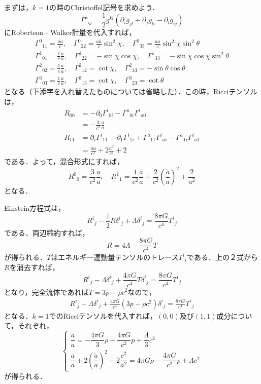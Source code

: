 \documentclass[a4paper]{ltjsreport}
\begin{document}
まずは，$k=1$の時のChristoffel記号を求めよう．
\[{\Gamma^k}_{ij}=\frac{1}{2}g^{kl}\left(\partial_ig_{jl} + \partial_jg_{li} - \partial_lg_{ij}\right)\]
にRobertson - Walker計量を代入すれば，
\begin{align*}
  {\Gamma^0}_{11}=\frac{a\dot{a}}{c}, \quad{\Gamma^0}_{22}=\frac{a\dot{a}}{c}\sin^2\chi, \quad{\Gamma^0}_{33}=\frac{a\dot{a}}{c}\sin^2\chi\sin^2\theta\\
  {\Gamma^1}_{01}=\frac{1}{c}\frac{\dot{a}}{a}, \quad{\Gamma^1}_{22}= - \sin\chi\cos\chi, \quad{\Gamma^1}_{33}= - \sin\chi\cos\chi\sin^2\theta\\
  {\Gamma^2}_{02}=\frac{1}{c}\frac{\dot{a}}{a}, \quad{\Gamma^2}_{12}=\cot\chi, \quad{\Gamma^2}_{33}= - \sin\theta\cos\theta\\
  {\Gamma^3}_{03}=\frac{1}{c}\frac{\dot{a}}{a}, \quad{\Gamma^3}_{13}=\cot\chi, \quad{\Gamma^3}_{23}=\cot\theta
\end{align*}
となる（下添字を入れ替えたものについては省略した）．この時，Ricciテンソルは，
\begin{align*}
  R_{00} &= -  \partial_0{\Gamma^i}_{0i} - {\Gamma^a}_{0i}{\Gamma^i}_{a0}\\
  &= -  \frac{3}{c^2}\frac{\ddot{a}}{a}\\
  R_{11} &= \partial_i{\Gamma^i}_{11} - \partial_1{\Gamma^i}_{1i} + {\Gamma^a}_{11}{\Gamma^i}_{ai} - {\Gamma^a}_{1i}{\Gamma^i}_{a1}\\
  &= \frac{a\ddot{a}}{c^2} + 2\frac{\dot{a}^2}{c^2} + 2
\end{align*}
である．よって，混合形式にすれば，
\[{R^0}_0=\frac{3}{c^2}\frac{\ddot{a}}{a}, \quad{R^1}_1=\frac{1}{c^2}\frac{\ddot{a}}{a} + \frac{2}{c^2}\left(\frac{\dot{a}}{a}\right)^2 + \frac{2}{a^2}\]
となる．

Einstein方程式は，
\[{R^i}_j - \frac{1}{2}R{\delta^i}_j + \Lambda{\delta^i}_j=\frac{8\pi{G}}{c^4}{T^i}_j\]
である．両辺縮約すれば，
\[R=4\Lambda - \frac{8\pi{G}}{c^4}T\]
が得られる．$T$はエネルギー運動量テンソルのトレース${T^i}_i$である．上の２式から$R$を消去すれば，
\[{R^i}_j - \Lambda{\delta^i}_j + \frac{4\pi{G}}{c^4}T{\delta^i}_j=\frac{8\pi{G}}{c^4}{T^i}_j\]
となり，完全流体であれば$T=3p - \rho{c^2}$なので，
\begin{align}
  {R^i}_j - \Lambda{\delta^i}_j + \frac{4\pi{G}}{c^4}\left(3p - \rho{c^2}\right){\delta^i}_j=\frac{8\pi{G}}{c^4}{T^i}_j
  \label{ein_field_eq}
\end{align}
となる．$k=1$でのRicciテンソルを代入すれば，$(0, 0)$及び$(1, 1)$成分について，それぞれ，
\[
\begin{cases}
  \dfrac{\ddot{a}}{a} = -  \dfrac{4\pi{G}}{3}\rho - \dfrac{4\pi{G}}{c^2}p + \dfrac{\Lambda}{3}c^2 \\[10pt]
  \dfrac{\ddot{a}}{a} + 2\left(\dfrac{\dot{a}}{a}\right)^2 + 2\dfrac{c^2}{a^2}=4\pi{G}\rho - \dfrac{4\pi{G}}{c^2}p + {\Lambda}c^2
\end{cases}
\]
が得られる．
\end{document}
